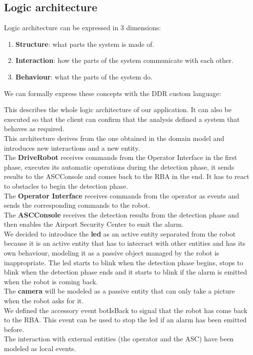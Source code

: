 \documentclass{llncs}
\begin{document}
\subsection{Logic architecture}
Logic architecture can be expressed in 3 dimensions:
\begin{enumerate}
\item \textbf{Structure}: what parts the system is made of.
\item \textbf{Interaction}: how the parts of the system communicate with each other.
\item \textbf{Behaviour}: what the parts of the system do.
\end{enumerate}
We can formally express these concepts with the DDR custom language:

This describes the whole logic architecture of our application. It can also be executed so that the client can confirm that the analysis defined a system that behaves as required.\\
This architecture derives from the one obtained in the domain model and introduces new interactions and a new entity.\\
The \textbf{DriveRobot} receives commands from the Operator Interface in the first phase, executes its automatic operations during the detection phase, it sends results to the ASCConsole and comes back to the RBA in the end. It has to react to obstacles to begin the detection phase.\\
The \textbf{Operator Interface} receives commands from the operator as events and sends the corresponding commands to the robot.\\
The \textbf{ASCConsole} receives the detection results from the detection phase and then enables the Airport Security Center to emit the alarm.\\
We decided to introduce the \textbf{led} as an active entity separated from the robot because it is an active entity that has to intecract with other entities and has its own behaviour, modeling it as a passive object managed by the robot is inappropriate. The led starts to blink when the detection phase begins, stops to blink when the detection phase ends and it starts to blink if the alarm is emitted when the robot is coming back.\\
The \textbf{camera} will be modeled as a passive entity that can only take a picture when the robot asks for it.\\
We defined the accessory event botIsBack to signal that the robot has come back to the RBA. This event can be used to stop the led if an alarm has been emitted before.\\
The interaction with external entities (the operator and the ASC) have been modeled as local events.
\end{document}
